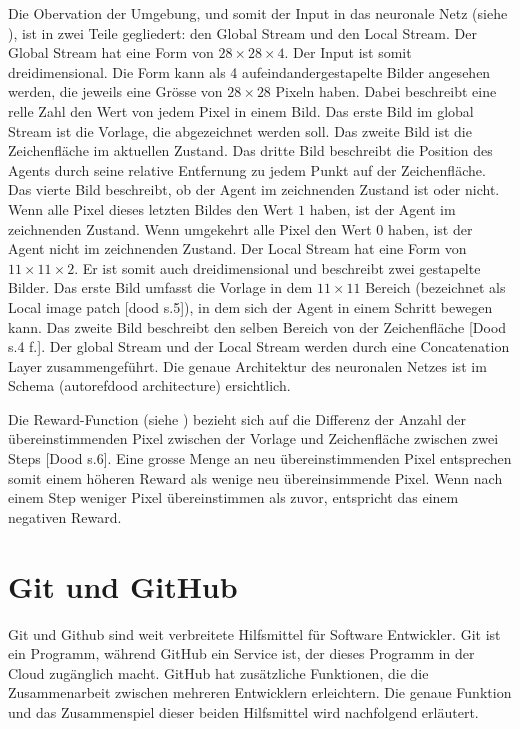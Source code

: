 Die Obervation der Umgebung, und somit der Input in das neuronale Netz (siehe
), ist in zwei Teile gegliedert: den Global Stream und
den Local Stream. Der Global Stream hat eine Form von $28\times28\times4$. Der
Input ist somit dreidimensional. Die Form kann als 4 aufeindandergestapelte
Bilder angesehen werden, die jeweils eine Grösse von $28\times28$ Pixeln haben.
Dabei beschreibt eine relle Zahl den Wert von jedem Pixel in einem Bild. Das
erste Bild im global Stream ist die Vorlage, die abgezeichnet werden soll. Das
zweite Bild ist die Zeichenfläche im aktuellen Zustand. Das dritte Bild
beschreibt die Position des Agents durch seine relative Entfernung zu jedem
Punkt auf der Zeichenfläche. Das vierte Bild beschreibt, ob der Agent im
zeichnenden Zustand ist oder nicht. Wenn alle Pixel dieses letzten Bildes den
Wert $1$ haben, ist der Agent im zeichnenden Zustand. Wenn umgekehrt alle Pixel
den Wert $0$ haben, ist der Agent nicht im zeichnenden Zustand. Der Local Stream
hat eine Form von $11\times11\times2$. Er ist somit auch dreidimensional und
beschreibt zwei gestapelte Bilder. Das erste Bild umfasst die Vorlage in dem
$11\times11$ Bereich (bezeichnet als Local image patch [dood s.5]), in dem sich
der Agent in einem Schritt bewegen kann. Das zweite Bild beschreibt den selben
Bereich von der Zeichenfläche [Dood s.4 f.]. Der global Stream und der Local
Stream werden durch eine Concatenation Layer zusammengeführt. Die genaue
Architektur des neuronalen Netzes ist im Schema (autoref{dood architecture})
ersichtlich.  


Die Reward-Function (siehe ) bezieht sich auf die
Differenz der Anzahl der übereinstimmenden Pixel zwischen der Vorlage und
Zeichenfläche zwischen zwei Steps [Dood s.6]. Eine grosse Menge an neu
übereinstimmenden Pixel entsprechen somit einem höheren Reward als wenige neu
übereinsimmende Pixel. Wenn nach einem Step weniger Pixel übereinstimmen als
zuvor, entspricht das einem negativen Reward. 

\section{Git und GitHub}\label{chap:t_git}
Git und Github sind weit verbreitete Hilfsmittel für Software Entwickler. Git
ist ein Programm, während GitHub ein Service ist, der dieses Programm in der
Cloud zugänglich macht. GitHub hat zusätzliche Funktionen, die die
Zusammenarbeit zwischen mehreren Entwicklern erleichtern. Die genaue Funktion
und das Zusammenspiel dieser beiden Hilfsmittel wird nachfolgend erläutert.

